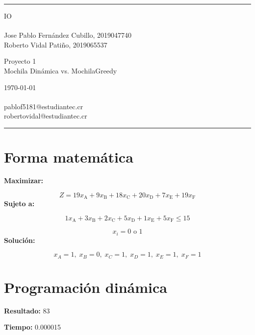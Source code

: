 \documentclass[a4paper]{article}
\begin{document}

\fancyhead[C]{}
\hrule \medskip %
\begin{minipage}{0.295\textwidth} %
\raggedright
IO\\ %
\footnotesize %
\hfill\\
Jose Pablo Fernández Cubillo, 2019047740 \\%
Roberto Vidal Patiño, 2019065537%
\end{minipage}
\begin{minipage}{0.4\textwidth} %
\centering 
\large %
Proyecto 1\\ %
\normalsize %
Mochila Dinámica vs. MochilaGreedy\\ %
\end{minipage}
\begin{minipage}{0.295\textwidth} %
\raggedleft
\today\\ %
\footnotesize %
\hfill\\
pablof5181@estudiantec.cr\\
robertovidal@estudiantec.cr%
\end{minipage}
\medskip\hrule %
\bigskip

\section{Forma matemática}
 \textbf{Maximizar:}

$$Z=19x_{\text{A}}+9x_{\text{B}}+18x_{\text{C}}+20x_{\text{D}}+7x_{\text{E}}+19x_{\text{F}}$$\textbf{Sujeto a:}

$$1x_{\text{A}}+3x_{\text{B}}+2x_{\text{C}}+5x_{\text{D}}+1x_{\text{E}}+5x_{\text{F}}\leq 15$$

$$x_i = 0 \text{ o } 1$$\textbf{Solución:}

$$x_A=1,\;x_B=0,\;x_C=1,\;x_D=1,\;x_E=1,\;x_F=1$$\section{Programación dinámica}
\textbf{Resultado:} 83

\textbf{Tiempo:} 0.000015
\end{document}
